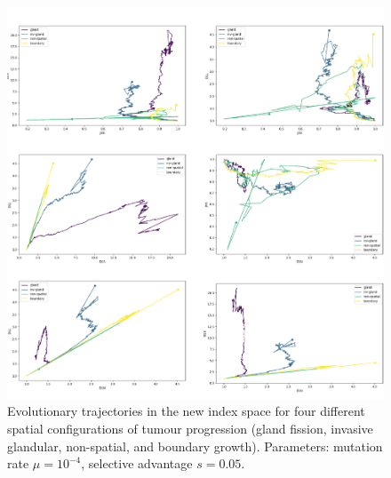 \begin{figure}[h!]
    \centering
    \includegraphics[width=\textwidth]{Chapter_3/figures/1e04005new.pdf}
    \caption{Evolutionary trajectories in the new index space for four
    different spatial configurations of tumour progression (gland fission,
    invasive glandular, non-spatial, and boundary growth). Parameters: mutation
    rate $\mu = 10^{-4}$, selective advantage $s = 0.05$.}
    \label{fig:1e04_005new}
\end{figure}
\clearpage

